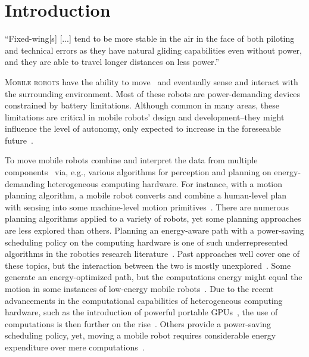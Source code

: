 
%
%
%
%
\chapter{Introduction}
\label{cp:intro}

\begin{chapquote}{\cite{wang2017curvature}}
  ``Fixed-wing[s] [...] tend to be more stable in the air in the face of both piloting and technical errors as they have natural gliding capabilities even without power, and they are able to travel longer distances on less power.''
\end{chapquote}

\vspace*{1em}

\lettrine{M}{obile robots} have the ability to move~\citep{corke2017robotics} and eventually sense and interact with the surrounding environment. Most of these robots are power-demanding devices constrained by battery limitations. Although common in many areas, these limitations are critical in mobile robots' design and development--they might influence the level of autonomy, only expected to increase in the foreseeable future~\citep{fisher2013verifying}.

To move mobile robots combine and interpret the data from multiple components~\citep{mei2006deployment} via, e.g., various algorithms for perception and planning on energy-demanding heterogeneous computing hardware. For instance, with a motion planning algorithm, a mobile robot converts and combine a human-level plan with sensing into some machine-level motion primitives~\citep{lavalle2006planning}. There are numerous planning algorithms applied to a variety of robots, yet some planning approaches are less explored than others. Planning an energy-aware path with a power-saving scheduling policy on the computing hardware is one of such underrepresented algorithms in the robotics research literature~\citep{sudhakar2020balancing,lahijanian2018resource,ondruska2015scheduled,brateman2006energy}. Past approaches well cover one of these topics, but the interaction between the two is mostly unexplored~\citep{brateman2006energy}. Some generate an energy-optimized path, but the computations energy might equal the motion in some instances of low-energy mobile robots~\citep{sudhakar2020balancing}. Due to the recent advancements in the computational capabilities of heterogeneous computing hardware, such as the introduction of powerful portable GPUs~\citep{rizvi2017general}, the use of computations is then further on the rise~\citep{abramov2012real,satria2016real,jaramillo2019visual}. Others provide a power-saving scheduling policy, yet, moving a mobile robot requires considerable energy expenditure over mere computations~\citep{mei2004energy,mei2005case}.

